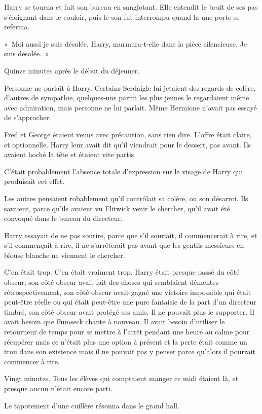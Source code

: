 Harry se tourna et fuit son bureau en sanglotant.
Elle entendit le bruit de ses pas s'éloignant dans le couloir, puis le son fut interrompu quand la une porte se referma.

«~Moi aussi je suis désolée, Harry, murmura-t-elle dans la pièce silencieuse.
Je suis désolée.~»

\later

Quinze minutes après le début du déjeuner.

Personne ne parlait à Harry.
Certains Serdaigle lui jetaient des regards de colère, d'autres de sympathie, quelques-uns parmi les plus jeunes le regardaient même avec admiration, mais personne ne lui parlait.
Même Hermione n'avait pas essayé de s'approcher.

Fred et George étaient venus avec précaution, sans rien dire.
L'offre était claire, et optionnelle.
Harry leur avait dit qu'il viendrait pour le dessert, pas avant.
Ils avaient hoché la tête et étaient vite partis.

C'était probablement l'absence totale d'expression sur le visage de Harry qui produisait cet effet.

Les autres pensaient robablement qu'il contrôlait sa colère, ou son désarroi.
Ils savaient, parce qu'ils avaient vu Flitwick venir le chercher, qu'il avait été convoqué dans le bureau du directeur.

Harry essayait de ne pas sourire, parce que s'il souriait, il commencerait à rire, et s'il commençait à rire, il ne s'arrêterait pas avant que les gentils messieurs en blouse blanche ne viennent le chercher.

C'en était trop.
C'en était vraiment trop.
Harry était presque passé du côté obscur, son côté obscur avait fait des choses qui semblaient démentes rétrospectivement, son côté obscur avait gagné une victoire impossible qui était peut-être réelle ou qui était peut-être une pure fantaisie de la part d'un directeur timbré, son côté obscur avait protégé ses amis.
Il ne pouvait plus le supporter.
Il avait besoin que Fumseck chante à nouveau.
Il avait besoin d'utiliser le retourneur de temps pour se mettre à l'arrêt pendant une heure au calme pour récupérer mais ce n'était plus une option à présent et la perte était comme un trou dans son existence mais il ne pouvait pas y penser parce qu'alors il pourrait commencer à rire.

Vingt minutes.
Tous les élèves qui comptaient manger ce midi étaient là, et presque aucun n'était encore parti.

Le tapotement d'une cuillère résonna dans le grand hall.

